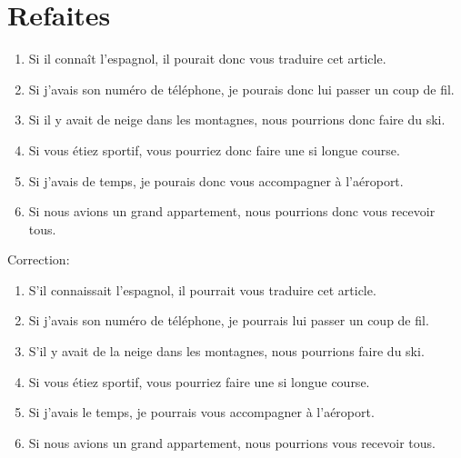 \documentclass{book}
\begin{document}
    \section{Refaites}
        \begin{enumerate}
            \item Si il connaît l'espagnol, il pourait donc vous traduire cet article.
            \item Si j'avais son numéro de téléphone, je pourais donc lui passer un coup de fil.
            \item Si il y avait de neige dans les montagnes, nous pourrions donc faire du ski.
            \item Si vous étiez sportif, vous pourriez donc faire une si longue course.
            \item Si j'avais de temps, je pourais donc vous accompagner à l'aéroport.
            \item Si nous avions un grand appartement, nous pourrions donc vous recevoir tous.
        \end{enumerate}
        Correction:
        \begin{enumerate}
            \item S'il connaissait l'espagnol, il pourrait vous traduire cet article.
            \item Si j'avais son numéro de téléphone, je pourrais lui passer un coup de fil.
            \item S'il y avait de la neige dans les montagnes, nous pourrions faire du ski.
            \item Si vous étiez sportif, vous pourriez faire une si longue course.
            \item Si j'avais le temps, je pourrais vous accompagner à l'aéroport.
            \item Si nous avions un grand appartement, nous pourrions vous recevoir tous.
        \end{enumerate}
\end{document}
